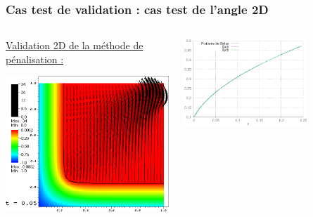 \documentclass{beamer}
\begin{document}
\begin{frame}
    \frametitle{Cas test de validation : cas test de l'angle 2D}
	\footnotesize


\begin{columns}
\begin{column}{0.5 \textwidth}

\color{cea_rouge}\underline{Validation 2D de la méthode de pénalisation :}\color{cea_texte}\\
     \begin{center}
        \includegraphics[width=1\textwidth]{Figures/angleIBCDiff0000.png}	

    \end{center}
\end{column}
    \begin{column}{0.5 \textwidth}
    \center \begin{tikzpicture}[scale = 0.2, every node/.style={scale=0.2}]
			
		\end{tikzpicture}
\begin{center}
	\includegraphics[width=0.7\textwidth]{Figures/AngleExEyDiff.eps}

\end{center}


   \end{column}
   \end{columns}


\end{frame}
\end{document}
